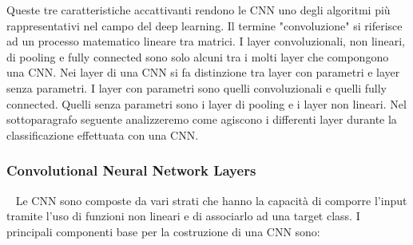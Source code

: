 Queste tre caratteristiche accattivanti rendono le CNN uno degli algoritmi più rappresentativi nel campo del deep
learning. Il termine "convoluzione" si riferisce ad un processo matematico lineare tra matrici. 
I layer convoluzionali, non lineari, di pooling e fully connected sono solo alcuni tra i molti layer che compongono 
una CNN. Nei layer di una CNN si fa distinzione tra layer con parametri e layer senza parametri. 
I layer con parametri sono quelli convoluzionali e quelli fully connected. Quelli senza parametri sono i layer 
di pooling e i layer non lineari. Nel sottoparagrafo seguente analizzeremo come agiscono i differenti layer durante 
la classificazione effettuata con una CNN.


\subsubsection{Convolutional Neural Network Layers}~\newline
Le CNN sono composte da vari strati che hanno la capacità di comporre l'input tramite l'uso di funzioni non lineari e 
di associarlo ad una target class.
I principali componenti base per la costruzione di una CNN sono:

